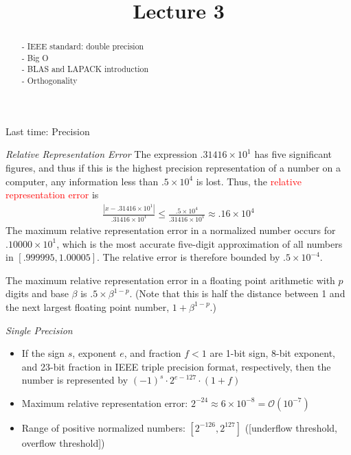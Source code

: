 \documentclass{ximera}
\begin{document}
    \title{Lecture 3}
    
    \begin{abstract} 
    - IEEE standard: double precision \\
    - Big O \\
    - BLAS and LAPACK introduction \\
    - Orthogonality
    \end{abstract}
    \maketitle

Last time: Precision 

\textit{Relative Representation Error}
    The expression $.31416\times 10^1$ has five significant figures, and thus if this is the highest precision representation of a number on a computer, any information less than $.5\times 10^4$ is lost.  Thus, the \textcolor{red}{relative representation error} is
    \begin{align}
        \frac{|x-.31416\times 10^1|}{.31416\times 10^1} \leq \frac{.5\times 10^4}{.31416\times 10^1} \approx .16 \times 10^4
    \end{align}
    The maximum relative representation error in a normalized number occurs for $.10000\times 10^1$, which is the most accurate five-digit approximation of all numbers in $[.999995, 1.00005]$.  The relative error is therefore bounded by $.5\times 10^{-4}$.  
    \begin{definition}
        The maximum relative representation error in a floating point arithmetic with $p$ digits and base $\beta$ is $.5\times \beta^{1-p}$. (Note that this is half the distance between 1 and the next largest floating point number, $1+\beta^{1-p}$.)
    \end{definition}

\textit{Single Precision}
\begin{itemize}
    \item If the sign $s$, exponent $e$, and fraction $f<1$ are 1-bit sign, 8-bit exponent, and 23-bit fraction in IEEE triple precision format, respectively, then the number is represented by $(-1)^s \cdot 2^{e-127}\cdot(1+f)$
    \item Maximum relative representation error: $2^{-24} \approx 6\times 10^{-8} = \mathcal{O}(10^{-7})$
    \item Range of positive normalized numbers: $[2^{-126}, 2^{127}]$ ([underflow threshold, overflow threshold])
\end{itemize}
\end{document}
